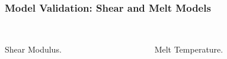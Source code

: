 \documentclass{beamer}
\begin{document}
    \begin{frame}
      \frametitle{Model Validation: Shear and Melt Models}
      \begin{columns}[t]
        \begin{column}{5cm}
          \centering
           \\
          {\scriptsize Shear Modulus.}
        \end{column}
        \begin{column}{5cm}
          \centering
           \\
          {\scriptsize Melt Temperature.}
        \end{column}
      \end{columns}
    \end{frame}
\end{document}
